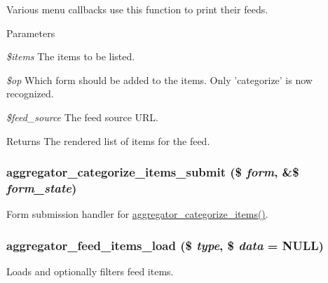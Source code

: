 Various menu callbacks use this function to print their feeds.


\begin{DoxyParams}{Parameters}
\item[{\em \$items}]The items to be listed. \item[{\em \$op}]Which form should be added to the items. Only 'categorize' is now recognized. \item[{\em \$feed\_\-source}]The feed source URL.\end{DoxyParams}
\begin{DoxyReturn}{Returns}
The rendered list of items for the feed. 
\end{DoxyReturn}
\hypertarget{aggregator_8pages_8inc_a04d005d45c0430ec3b97884ef4470d4f}{
\subsubsection[{aggregator\_\-categorize\_\-items\_\-submit}]{\setlength{\rightskip}{0pt plus 5cm}aggregator\_\-categorize\_\-items\_\-submit (\$ {\em form}, \/  \&\$ {\em form\_\-state})}}
\label{aggregator_8pages_8inc_a04d005d45c0430ec3b97884ef4470d4f}
Form submission handler for \hyperlink{group__forms_gad110881d125af4a6c5c2182a52fe4c69}{aggregator\_\-categorize\_\-items()}. \hypertarget{aggregator_8pages_8inc_a9418271c731d9c644ef13b40c3a8df6b}{
\subsubsection[{aggregator\_\-feed\_\-items\_\-load}]{\setlength{\rightskip}{0pt plus 5cm}aggregator\_\-feed\_\-items\_\-load (\$ {\em type}, \/  \$ {\em data} = {\ttfamily NULL})}}
\label{aggregator_8pages_8inc_a9418271c731d9c644ef13b40c3a8df6b}
Loads and optionally filters feed items.


